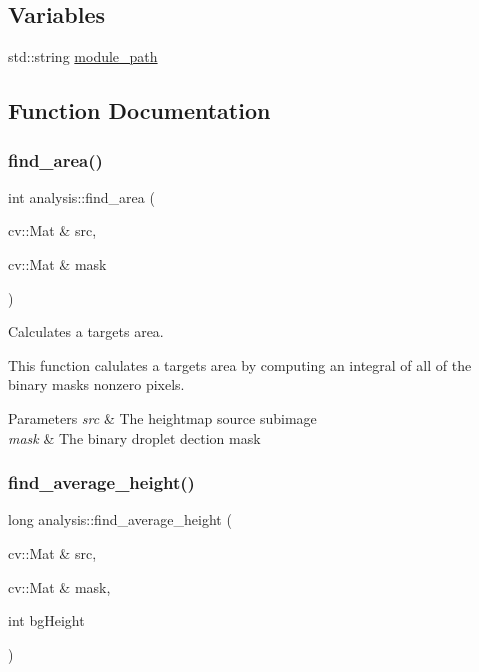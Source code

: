 \subsection*{Variables}
\begin{DoxyCompactItemize}
\item 
std\+::string \hyperlink{namespaceanalysis_a2dcdafce3743ed2b2c8ba209994cb4e1}{module\+\_\+path}
\end{DoxyCompactItemize}


\subsection{Function Documentation}
\mbox{\label{namespaceanalysis_ad544440f3a463acd72807f108c6c5fbf}} 
\subsubsection{\texorpdfstring{find\+\_\+area()}{find\_area()}}
{\footnotesize\ttfamily int analysis\+::find\+\_\+area (\begin{DoxyParamCaption}\item[{cv\+::\+Mat \&}]{src,  }\item[{cv\+::\+Mat \&}]{mask }\end{DoxyParamCaption})}



Calculates a target\textquotesingle{}s area. 

This function calulates a target\textquotesingle{}s area by computing an integral of all of the binary mask\textquotesingle{}s nonzero pixels.


\begin{DoxyParams}{Parameters}
{\em src} & The heightmap source subimage \\
\hline
{\em mask} & The binary droplet dection mask \\
\hline
\end{DoxyParams}
\mbox{\label{namespaceanalysis_adb80c786b6da83f9a3a82f6e404350e0}} 
\subsubsection{\texorpdfstring{find\+\_\+average\+\_\+height()}{find\_average\_height()}}
{\footnotesize\ttfamily long analysis\+::find\+\_\+average\+\_\+height (\begin{DoxyParamCaption}\item[{cv\+::\+Mat \&}]{src,  }\item[{cv\+::\+Mat \&}]{mask,  }\item[{int}]{bg\+Height }\end{DoxyParamCaption})}



